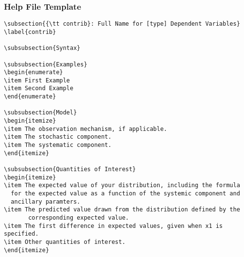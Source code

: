 \begin{itemize}
\subsubsection*{Help File Template}
\begin{verbatim}
\subsection{{\tt contrib}: Full Name for [type] Dependent Variables}
\label{contrib}

\subsubsection{Syntax}

\subsubsection{Examples}
\begin{enumerate}
\item First Example
\item Second Example
\end{enumerate}

\subsubsection{Model}
\begin{itemize}
\item The observation mechanism, if applicable.
\item The stochastic component.
\item The systematic component.
\end{itemize}

\subsubsection{Quantities of Interest}
\begin{itemize}
\item The expected value of your distribution, including the formula
  for the expected value as a function of the systemic component and
  ancillary paramters.  
\item The predicted value drawn from the distribution defined by the
       corresponding expected value.  
\item The first difference in expected values, given when x1 is specified.  
\item Other quantities of interest.
\end{itemize}


\end{verbatim}
\end{itemize}
